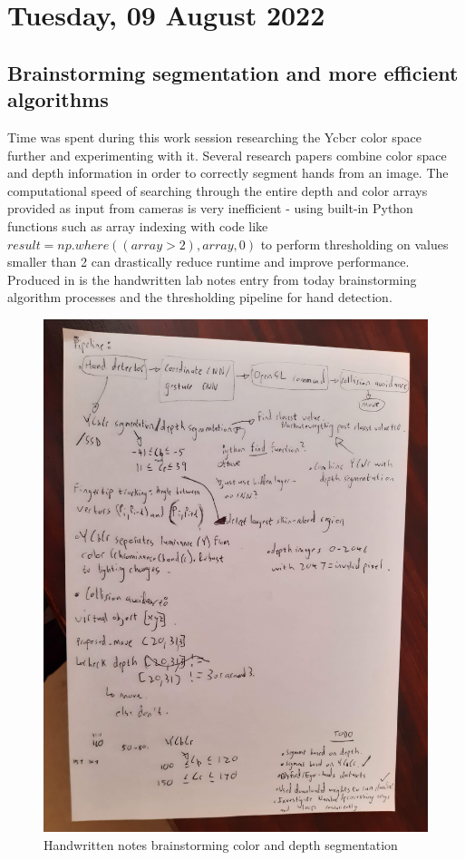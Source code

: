 \section[2022/08/09]{Tuesday, 09 August 2022}

\subsection{Brainstorming segmentation and more efficient algorithms}

Time was spent during this work session researching the Ycbcr color space further and experimenting with it. Several research papers combine color space and depth information in order to correctly segment hands from an image. The computational speed of searching through the entire depth and color arrays provided as input from cameras is very inefficient - using built-in Python functions such as array indexing with code like $result = np.where((array >2), array, 0)$ to perform thresholding on values smaller than 2 can drastically reduce runtime and improve performance. Produced in  is the handwritten lab notes entry from today brainstorming algorithm processes and the thresholding pipeline for hand detection.

\begin{figure}[h]
    \centering
    \includegraphics[width=0.7\linewidth]{figures/handwritten_notes_9_aug.jpg}
    \caption{Handwritten notes brainstorming color and depth segmentation}
    \label{fig:handwritten_notes_9_aug}
\end{figure}

